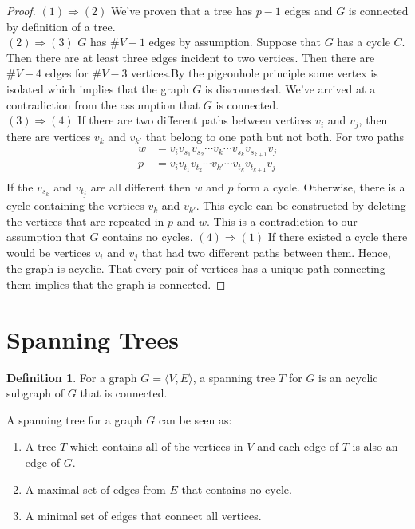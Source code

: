 \documentclass[10pt, letterpaper]{article}
\theoremstyle{remark}
\theoremstyle{definition}
\newtheorem{defn}{Definition}
\begin{document}
\begin{proof}
	$(1) \Rightarrow (2)$ We've proven that a tree has $p-1$ edges and $G$ is connected by definition of a tree. \\
	$(2) \Rightarrow (3)$ $G$ has $\#V-1$ edges by assumption. Suppose that $G$ has a cycle $C$. Then there are at least
	three edges incident to two vertices. Then there are $\#V - 4$ edges for $\#V-3$ vertices.By the pigeonhole principle
	some vertex is isolated which implies that the graph $G$ is disconnected. We've arrived at a contradiction from the
	assumption that $G$ is connected.\\
	$(3) \Rightarrow (4)$ If there are two different paths between vertices $v_i$ and $v_j$, then there are vertices $v_k$
	and $v_{k'}$ that belong to one path but not both. For two paths
	\begin{align*}
		w &= v_i v_{s_1}v_{s_2} \cdots v_k \cdots v_{s_k}v_{s_{k+1}}v_j \\
		p &= v_i v_{t_1}v_{t_{2}} \cdots v_{k'} \cdots v_{t_k}v_{t_{k+1}}v_j \\
	\end{align*}
	If the $v_{s_k}$ and $v_{t_j}$ are all different then $w$ and $p$ form a cycle. Otherwise, there is a cycle
	containing the vertices $v_k$ and $v_{k'}$. This cycle can be constructed by deleting the vertices that are
	repeated in $p$ and $w$. This is a contradiction to our assumption that $G$ contains no cycles.
	$(4) \Rightarrow (1)$ If there existed a cycle there would be vertices $v_i$ and $v_j$ that had two different paths
	between them. Hence, the graph is acyclic. That every pair of vertices has a unique path connecting them implies
	that the graph is connected.
\end{proof}

\section{Spanning Trees}

\begin{defn}
	For a graph $G = \langle V,E \rangle$, a spanning tree $T$ for $G$ is an acyclic subgraph of $G$ that is connected.
\end{defn}

A spanning tree for a graph $G$ can be seen as:
\begin{enumerate}
	\item A tree $T$ which contains all of the vertices in $V$ and each edge of $T$ is also an edge of $G$.
	\item A maximal set of edges from $E$ that contains no cycle.
	\item A minimal set of edges that connect all vertices.
\end{enumerate}
\end{document}
